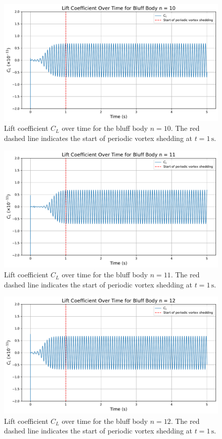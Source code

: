 \begin{figure}[H]
	\centering
	\includegraphics[width=\textwidth]{images/10face_graph}
	\caption{Lift coefficient $C_L$ over time for the bluff body $n=10$. The red dashed line indicates the start of periodic vortex shedding at $t = 1\,\mathrm{s}$.}
	\label{fig:10FaceGraph} 
\end{figure}

\begin{figure}[H]
	\centering
	\includegraphics[width=\textwidth]{images/11face_graph}
	\caption{Lift coefficient $C_L$ over time for the bluff body $n=11$. The red dashed line indicates the start of periodic vortex shedding at $t = 1\,\mathrm{s}$.}
	\label{fig:11FaceGraph} 
\end{figure}

\begin{figure}[H]
	\centering
	\includegraphics[width=\textwidth]{images/12face_graph}
	\caption{Lift coefficient $C_L$ over time for the bluff body $n=12$. The red dashed line indicates the start of periodic vortex shedding at $t = 1\,\mathrm{s}$.}
	\label{fig:12FaceGraph} 
\end{figure}

